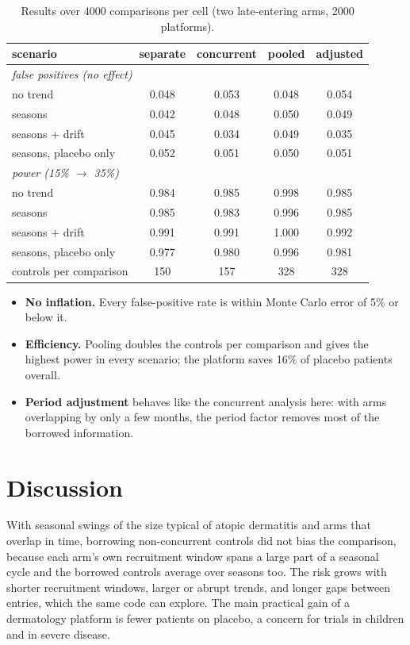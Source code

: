 \documentclass[11pt]{article}
\begin{document}
\begin{table}[h]
\centering
\begin{tabular}{lcccc}
\toprule
scenario & separate & concurrent & pooled & adjusted \\
\midrule
\multicolumn{5}{l}{\emph{false positives (no effect)}} \\
no trend & 0.048 & 0.053 & 0.048 & 0.054 \\
seasons & 0.042 & 0.048 & 0.050 & 0.049 \\
seasons + drift & 0.045 & 0.034 & 0.049 & 0.035 \\
seasons, placebo only & 0.052 & 0.051 & 0.050 & 0.051 \\
\multicolumn{5}{l}{\emph{power (15\% $\to$ 35\%)}} \\
no trend & 0.984 & 0.985 & 0.998 & 0.985 \\
seasons & 0.985 & 0.983 & 0.996 & 0.985 \\
seasons + drift & 0.991 & 0.991 & 1.000 & 0.992 \\
seasons, placebo only & 0.977 & 0.980 & 0.996 & 0.981 \\
\midrule
controls per comparison & 150 & 157 & 328 & 328 \\
\bottomrule
\end{tabular}
\caption{Results over 4000 comparisons per cell (two late-entering arms, 2000 platforms).}
\label{tab}
\end{table}

\begin{itemize}
\item \textbf{No inflation.} Every false-positive rate is within Monte Carlo error of 5\% or below it.
\item \textbf{Efficiency.} Pooling doubles the controls per comparison and gives the highest power in every scenario;
the platform saves 16\% of placebo patients overall.
\item \textbf{Period adjustment} behaves like the concurrent analysis here: with arms overlapping by only a few
months, the period factor removes most of the borrowed information.
\end{itemize}

\section{Discussion}
With seasonal swings of the size typical of atopic dermatitis and arms that overlap in time, borrowing non-concurrent
controls did not bias the comparison, because each arm's own recruitment window spans a large part of a seasonal
cycle and the borrowed controls average over seasons too. The risk grows with shorter recruitment windows, larger
or abrupt trends, and longer gaps between entries, which the same code can explore. The main practical gain of a
dermatology platform is fewer patients on placebo, a concern for trials in children and in severe disease.
\end{document}
